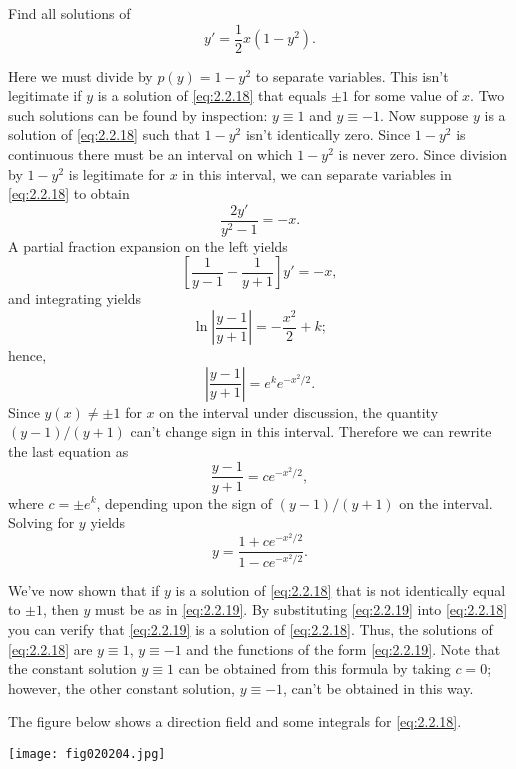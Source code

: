 \documentclass{ximera}
\begin{document}
\begin{example}\label{example:2.2.5}
Find all solutions of
\begin{equation} \label{eq:2.2.18}
y'=\frac{1}{2}x(1-y^2).
\end{equation}
 
\begin{explanation}
 
Here we must divide by $p(y)=1-y^2$ to separate variables.
This isn't  legitimate if $y$ is a solution of \eqref{eq:2.2.18} that
equals $\pm 1$ for some value of $x$. Two such solutions can be found
by inspection: $y \equiv 1$ and $y\equiv -1$. Now suppose
$y$ is a solution of \eqref{eq:2.2.18} such that $1-y^2$ isn't
identically zero. Since $1-y^2$ is continuous there must be an
interval on which $1-y^2$ is never zero. Since division by $1-y^2$ is
legitimate for $x$ in this interval, we can separate variables in
\eqref{eq:2.2.18} to obtain
$$
\frac{2y'}{y^2-1}=-x.
$$
 A partial fraction expansion on the left yields
$$
\left[\frac{1}{y-1}-\frac{1}{y+1}\right]y'=-x,
$$
and integrating  yields
$$
\ln\left|\frac{y-1}{y+1}\right|=-\frac{x^2}{2}+k;
$$
 hence,
$$
\left|\frac{y-1}{y+1}\right|=e^ke^{-x^2/2}.
$$
 Since $y(x)\neq \pm 1$ for $x$ on the interval under discussion, the
quantity
$(y-1)/(y+1)$  can't  change sign in this interval. Therefore
we can rewrite the last equation as
$$
\frac{y-1}{y+1}=ce^{-x^2/2},
$$
  where $c=\pm e^k$, depending upon the sign of $(y-1)/(y+1)$ on the
interval.
 Solving for  $y$ yields
\begin{equation} \label{eq:2.2.19}
y=\frac{1+ce^{-x^2/2}}{1-ce^{-x^2/2}}.
\end{equation}
 
We've now shown that if $y$ is a solution of \eqref{eq:2.2.18} that  is
not identically equal to $\pm 1$, then $y$ must be as in
\eqref{eq:2.2.19}. By substituting \eqref{eq:2.2.19} into \eqref{eq:2.2.18} you
 can verify that \eqref{eq:2.2.19} is  a solution of
\eqref{eq:2.2.18}. Thus,  the solutions of \eqref{eq:2.2.18}
are $y\equiv 1$, $y\equiv -1$ and the functions of the form
\eqref{eq:2.2.19}. Note that the constant solution $y \equiv 1$ can be
obtained from this formula by taking $c=0$;     however, the other
constant solution, $y \equiv -1$, can't be obtained in this way.
 
The figure below shows a direction field and some integrals for
\eqref{eq:2.2.18}.
 
 
\begin{image}
  \texttt{[image: fig020204.jpg]}
\end{image}
\end{explanation}
\end{example}
 
\end{document}
